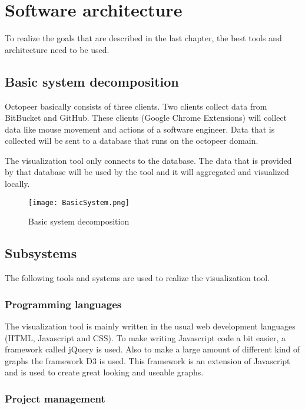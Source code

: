 \documentclass{article}
\begin{document}
\section{Software architecture}

To realize the goals that are described in the last chapter, the best tools and architecture need to be used.

\subsection{Basic system decomposition}

Octopeer basically consists of three clients. Two clients collect data from BitBucket and GitHub. These clients (Google Chrome Extensions) will collect data like mouse movement and actions of a software engineer. Data that is collected will be sent to a database that runs on the octopeer domain.

The visualization tool only connects to the database. The data that is provided by that database will be used by the tool and it will aggregated and visualized locally.

\begin{figure}[htp]
\centering
\texttt{[image: BasicSystem.png]}
\caption{Basic system decomposition}
\end{figure}

\subsection{Subsystems}

The following tools and systems are used to realize the visualization tool.

\subsubsection{Programming languages}

The visualization tool is mainly written in the usual web development languages (HTML, Javascript and CSS). To make writing Javascript code a bit easier, a framework called jQuery is used. Also to make a large amount of different kind of graphs the framework D3 is used. This framework is an extension of Javascript and is used to create great looking and useable graphs.

\subsubsection{Project management}
\end{document}
